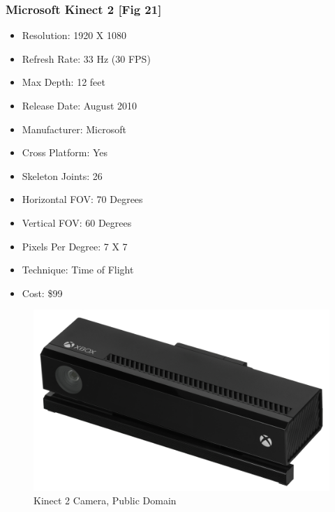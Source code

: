 \documentclass[a4paper,10pt]{article}
\begin{document}
	\subsubsection{Microsoft Kinect 2 [Fig 21]}
\begin{itemize}
  \item Resolution: 1920 X 1080
  \item Refresh Rate: 33 Hz (30 FPS)
  \item Max Depth: 12 feet
  \item Release Date: August 2010 
  \item Manufacturer: Microsoft
  \item Cross Platform: Yes
  \item Skeleton Joints: 26
  \item Horizontal FOV: 70 Degrees
  \item Vertical FOV: 60 Degrees
  \item Pixels Per Degree: 7 X 7
  \item Technique: Time of Flight
  \item Cost: \$99
\end{itemize}
\begin{figure}[H]
	\includegraphics[width=\linewidth,height=\paperheight,keepaspectratio]{kinect2.jpg}
	\caption{Kinect 2 Camera, Public Domain}
	\label{fig:k2Cam}
	\end{figure}
	\pagebreak
	
\end{document}
